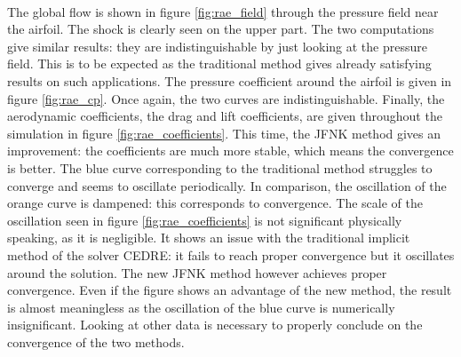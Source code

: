        \paragraph{}
        The global flow is shown in figure \ref{fig:rae_field} through the pressure field near the airfoil.
        The shock is clearly seen on the upper part.
        The two computations give similar results: they are indistinguishable by just looking at the pressure field.
        This is to be expected as the traditional method gives already satisfying results on such applications.
        The pressure coefficient around the airfoil is given in figure \ref{fig:rae_cp}.
        Once again, the two curves are indistinguishable.
        Finally, the aerodynamic coefficients, the drag and lift coefficients, are given throughout the simulation in figure \ref{fig:rae_coefficients}.
        This time, the JFNK method gives an improvement: the coefficients are much more stable, which means the convergence is better.
        The blue curve corresponding to the traditional method struggles to converge and seems to oscillate periodically.
        In comparison, the oscillation of the orange curve is dampened: this corresponds to convergence.
        The scale of the oscillation seen in figure \ref{fig:rae_coefficients} is not significant physically speaking, as it is negligible.
        It shows an issue with the traditional implicit method of the solver CEDRE: it fails to reach proper convergence but it oscillates around the solution.
        The new JFNK method however achieves proper convergence.
        Even if the figure shows an advantage of the new method, the result is almost meaningless as the oscillation of the blue curve is numerically insignificant.
        Looking at other data is necessary to properly conclude on the convergence of the two methods.


